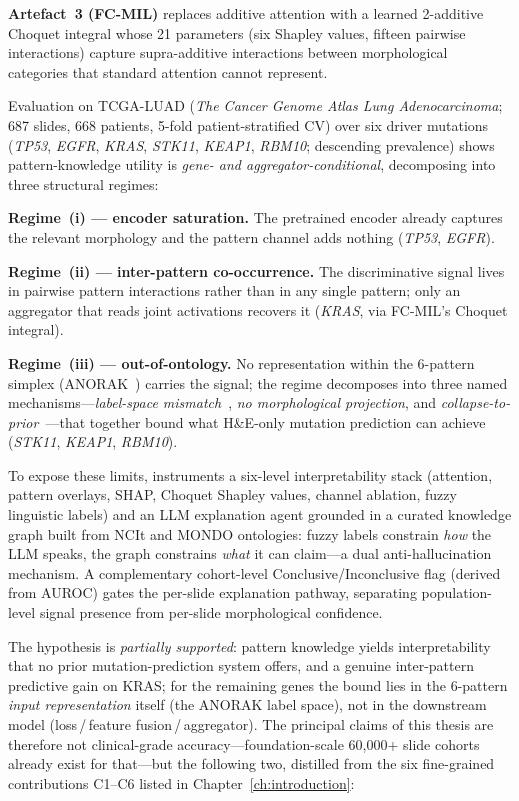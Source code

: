 \textbf{Artefact~3 (FC-MIL)} replaces additive attention with a
learned 2-additive Choquet integral whose 21 parameters (six
Shapley values, fifteen pairwise interactions) capture
supra-additive interactions between morphological categories
that standard attention cannot represent.

Evaluation on TCGA-LUAD (\emph{The Cancer Genome Atlas Lung
Adenocarcinoma}; 687 slides, 668 patients, 5-fold
patient-stratified CV) over six driver mutations
(\textit{TP53}, \textit{EGFR}, \textit{KRAS}, \textit{STK11},
\textit{KEAP1}, \textit{RBM10}; descending prevalence) shows
pattern-knowledge utility is \emph{gene- and
aggregator-conditional}, decomposing into three structural
regimes:

\textbf{Regime~(i) --- encoder saturation.}
The pretrained encoder already captures the relevant morphology
and the pattern channel adds nothing
(\textit{TP53}, \textit{EGFR}).

\textbf{Regime~(ii) --- inter-pattern co-occurrence.}
The discriminative signal lives in pairwise pattern interactions
rather than in any single pattern; only an aggregator that reads
joint activations recovers it
(\textit{KRAS}, via FC-MIL's Choquet integral).

\textbf{Regime~(iii) --- out-of-ontology.}
No representation within the 6-pattern simplex
(ANORAK~\cite{anorak2024}) carries the signal; the regime
decomposes into three named mechanisms---\emph{label-space
mismatch}~\cite{lipton2018labelshift}, \emph{no morphological
projection}, and
\emph{collapse-to-prior}~\cite{bowman2016posteriorcollapse}---that
together bound what H\&E-only mutation prediction can achieve
(\textit{STK11}, \textit{KEAP1}, \textit{RBM10}).

To expose these limits, \lchai{} instruments a six-level
interpretability stack (attention, pattern overlays, SHAP,
Choquet Shapley values, channel ablation, fuzzy linguistic
labels) and an LLM explanation agent grounded in a curated
knowledge graph built from NCIt and MONDO ontologies: fuzzy
labels constrain \emph{how} the LLM speaks, the graph
constrains \emph{what} it can claim---a dual anti-hallucination
mechanism.
A complementary cohort-level Conclusive/Inconclusive flag
(derived from AUROC) gates the per-slide explanation pathway,
separating population-level signal presence from per-slide
morphological confidence.

The hypothesis is \emph{partially supported}: pattern knowledge
yields interpretability that no prior mutation-prediction system
offers, and a genuine inter-pattern predictive gain on KRAS; for
the remaining genes the bound lies in the 6-pattern \emph{input
representation} itself (the ANORAK label space), not in the
downstream model
(loss\,/\,feature fusion\,/\,aggregator).
The principal claims of this thesis are therefore not
clinical-grade accuracy---foundation-scale 60{,}000+ slide
cohorts already exist for that---but the following two,
distilled from the six fine-grained contributions C1--C6
listed in Chapter~\ref{ch:introduction}:

